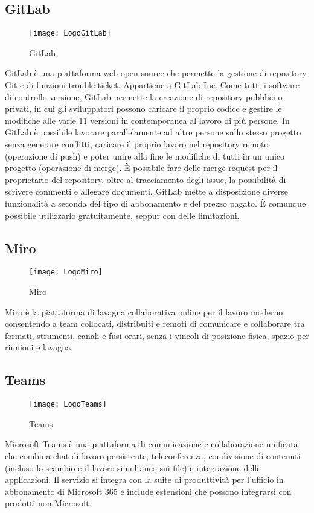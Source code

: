 \subsection{GitLab}
\begin{figure}[htpb!]
\center
  \texttt{[image: LogoGitLab]}
  \caption{GitLab}
\end{figure}
GitLab è una piattaforma web open source che permette la gestione di repository Git e di funzioni trouble ticket. Appartiene a GitLab Inc.
Come tutti i software di controllo versione, GitLab permette la creazione di repository pubblici o privati, in cui gli sviluppatori possono caricare il proprio codice e gestire le modifiche alle varie
11
versioni in contemporanea al lavoro di più persone. In GitLab è possibile lavorare parallelamente ad altre persone sullo stesso progetto senza generare conflitti, caricare il proprio lavoro nel repository remoto (operazione di push) e poter unire alla fine le modifiche di tutti in un unico progetto (operazione di merge). È possibile fare delle merge request per il proprietario del repository, oltre al tracciamento degli issue, la possibilità di scrivere commenti e allegare documenti. GitLab mette a disposizione diverse funzionalità a seconda del tipo di abbonamento e del prezzo pagato. È comunque possibile utilizzarlo gratuitamente, seppur con delle limitazioni.

\newpage
\subsection{Miro}
\begin{figure}[htpb!]
\center
  \texttt{[image: LogoMiro]}
  \caption{Miro}
\end{figure}
Miro è la piattaforma di lavagna collaborativa online per il lavoro moderno, consentendo a team collocati, distribuiti e remoti di comunicare e collaborare tra formati, strumenti, canali e fusi orari, senza i vincoli di posizione fisica, spazio per riunioni e lavagna
\subsection{Teams}
\begin{figure}[htpb!]
\center
  \texttt{[image: LogoTeams]}
  \caption{Teams}
\end{figure}
Microsoft Teams è una piattaforma di comunicazione e collaborazione unificata che combina chat di lavoro persistente, teleconferenza, condivisione di contenuti (incluso lo scambio e il lavoro simultaneo sui file) e integrazione delle applicazioni. Il servizio si integra con la suite di produttività per l'ufficio in abbonamento di Microsoft 365 e include estensioni che possono integrarsi con prodotti non Microsoft.
